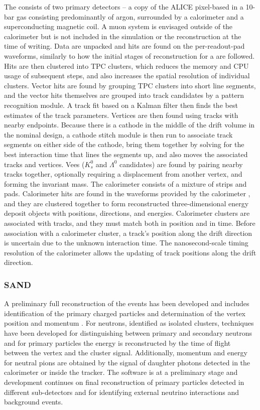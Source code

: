 \documentclass[../main-v1.tex]{subfiles}
\begin{document}
The  consists of two primary detectors -- a copy of the ALICE pixel-based  in a 10-bar gas consisting predominantly of argon, surrounded by a calorimeter and a superconducting magnetic coil.  A muon system is envisaged outside of the calorimeter but is not included in the simulation or the reconstruction at the time of writing.  Data are unpacked and hits are found on the per-readout-pad waveforms, similarly to how the initial stages of reconstruction for a  are followed.  Hits are then clustered into TPC clusters, which reduces the memory and CPU usage of subsequent steps, and also increases the spatial resolution of individual clusters.  Vector hits are found by grouping TPC clusters into short line segments, and the vector hits themselves are grouped into track candidates by a pattern recognition module.  A track fit based on a Kalman filter then finds the best estimates of the track parameters.  Vertices are then found using tracks with nearby endpoints.  Because there is a cathode in the middle of the drift volume in the nominal  design, 
a cathode stitch module is then run to associate track segments on either side of the cathode, bring them together by solving for the best interaction time that lines the segments up, and also moves the associated tracks and vertices.  Vees ($K^0_s$ and
$\Lambda^0$ candidates) are found by pairing nearby tracks together, optionally requiring a displacement from another vertex, and forming the invariant mass.  The calorimeter consists of a mixture of strips and pads.  Calorimeter hits are found in the  waveforms provided by the calorimeter , and they are clustered together to form reconstructed three-dimensional energy deposit objects with positions, directions, and energies.  Calorimeter clusters are associated with tracks, and they must match both in position and in time.  Before association with a calorimeter cluster, a track's position along the drift direction is uncertain due to the unknown interaction time.
The nanosecond-scale timing resolution of the calorimeter allows the updating of track positions along the drift direction.

\subsubsection{SAND}

A preliminary full reconstruction of the events has been developed and includes identification of the primary charged particles and determination of the vertex position and momentum . For neutrons, identified as isolated clusters, techniques have been developed for distinguishing between primary and secondary neutrons and for primary particles the energy is reconstructed by the time of flight between the vertex and the cluster signal. Additionally, momentum and energy for neutral pions are obtained by the signal of daughter photons detected in the calorimeter or inside the tracker.
The software is at a preliminary stage and development continues on final reconstruction of primary particles detected in different sub-detectors and for identifying external neutrino interactions and background events.
\end{document}
